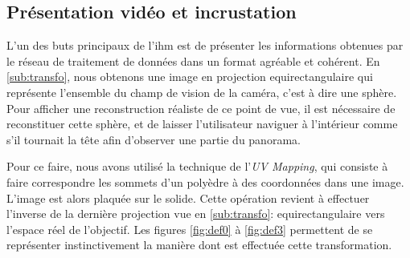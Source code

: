 		\subsection{Présentation vidéo et incrustation}
			
			L'un des buts principaux de l'\gls{ihm} est de présenter les informations obtenues par le réseau de traitement de données dans un format agréable et cohérent. En \autoref{sub:transfo}, nous obtenons une image en projection equirectangulaire qui représente l'ensemble du champ de vision de la caméra, c'est à dire une sphère. Pour afficher une reconstruction réaliste de ce point de vue, il est nécessaire de reconstituer cette sphère, et de laisser l'utilisateur naviguer à l'intérieur comme s'il tournait la tête afin d'observer une partie du panorama.
			\par
			Pour ce faire, nous avons utilisé la technique de l'\emph{UV Mapping}, qui consiste à faire correspondre les sommets d'un polyèdre à des coordonnées dans une image. L'image est alors \og plaquée \fg{} sur le solide. Cette opération revient à effectuer l'inverse de la dernière projection vue en \autoref{sub:transfo}: equirectangulaire vers l'espace réel de l'objectif. Les figures \ref{fig:def0} à \ref{fig:def3} permettent de se représenter instinctivement la manière dont est effectuée cette transformation.
			
